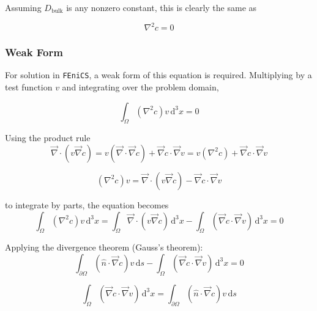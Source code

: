 Assuming $D_{\mathrm{bulk}}$ is any nonzero constant, this is clearly the same as

\begin{equation}
\nabla^2 c = 0
\end{equation}


\subsubsection{Weak Form}\label{subsubsec:unhom_fick_weak}

For solution in \texttt{FEniCS}, a weak form of this equation is required.
Multiplying by a test function $v$ and integrating over the problem domain,

\begin{equation}
\int_{\Omega} \left(\nabla^2 c \right) v \,\mathrm{d}^3x = 0
\end{equation}

Using the product rule
\begin{equation}
\vec{\nabla} \cdot \left( v \vec{\nabla} c \right) =
v \left(\vec{\nabla} \cdot \vec{\nabla} c \right) + \vec{\nabla}c \cdot \vec{\nabla}v =
v \left(\nabla^2 c \right) + \vec{\nabla}c \cdot \vec{\nabla}v
\end{equation}

\begin{equation}
\left(\nabla^2 c \right) v =
\vec{\nabla} \cdot \left( v \vec{\nabla} c \right) - \vec{\nabla}c \cdot \vec{\nabla}v
\end{equation}

to integrate by parts, the equation becomes
\begin{equation}
\int_{\Omega} \left(\nabla^2 c \right) v \,\mathrm{d}^3x =
\int_{\Omega} \vec{\nabla} \cdot \left( v \vec{\nabla} c \right) \,\mathrm{d}^3x
- \int_{\Omega} \left( \vec{\nabla}c \cdot \vec{\nabla}v \right) \,\mathrm{d}^3x =0
\end{equation}

Applying the divergence theorem (Gauss's theorem):
\begin{equation}
\int_{\partial\Omega} \left( \hat{n} \cdot \vec{\nabla} c \right) v\,\mathrm{d}s
- \int_{\Omega} \left( \vec{\nabla}c \cdot \vec{\nabla}v \right) \,\mathrm{d}^3x = 0
\end{equation}

\begin{equation}
\int_{\Omega} \left( \vec{\nabla}c \cdot \vec{\nabla}v \right) \,\mathrm{d}^3x =
\int_{\partial\Omega} \left( \hat{n} \cdot \vec{\nabla} c \right) v\,\mathrm{d}s
\end{equation}

